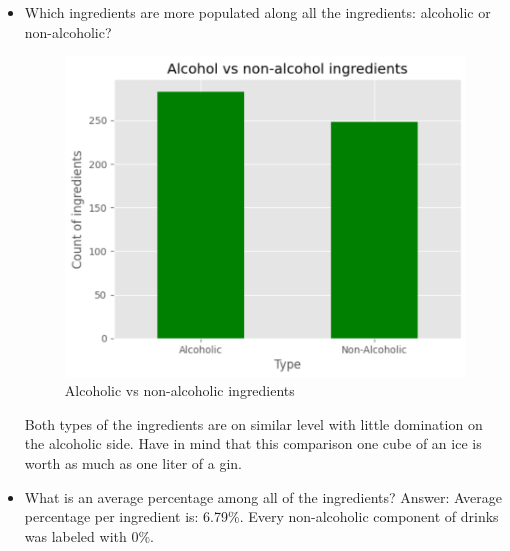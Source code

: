 \documentclass[a4paper]{article}
\begin{document}
\begin{itemize}
    \item Which ingredients are more populated along all the ingredients: alcoholic or non-alcoholic?
    \begin{figure}[H]
        \centering
        \includegraphics[width=0.8\linewidth]{alcoholicvs.png}
        \caption{Alcoholic vs non-alcoholic ingredients}
        \label{fig:enter-label}
    \end{figure}
    Both types of the ingredients are on similar level with little domination on the alcoholic side. Have in mind that this comparison one cube of an ice is worth as much as one liter of a gin.

    \item What is an average percentage among all of the ingredients?
    Answer: Average percentage per ingredient is: 6.79\%. Every non-alcoholic component of drinks was labeled with 0\%.
\end{itemize}
\end{document}
